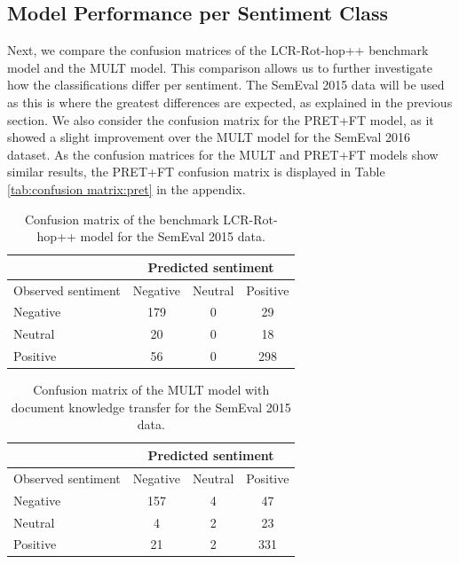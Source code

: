 \subsection{Model Performance per Sentiment Class}
Next, we compare the confusion matrices of the LCR-Rot-hop++ benchmark model and the MULT model. This comparison allows us to further investigate how the classifications differ per sentiment. The SemEval 2015 data will be used as this is where the greatest differences are expected, as explained in the previous section. We also consider the confusion matrix for the PRET+FT model, as it showed a slight improvement over the MULT model for the SemEval 2016 dataset. As the confusion matrices for the MULT and PRET+FT models show similar results, the PRET+FT confusion matrix is displayed in Table \ref{tab:confusion matrix:pret} in the appendix. 
\begin{table}[h]
\caption{Confusion matrix of the benchmark LCR-Rot-hop++ model for the SemEval 2015 data.}
\label{tab:confusion matrix LCR}
\setlength{\tabcolsep}{28.3pt}
\begin{tabular}{@{}lccc@{}}
\toprule
                   & \multicolumn{3}{c}{Predicted sentiment} \\ \midrule
Observed sentiment & Negative     & Neutral    & Positive    \\ \midrule
Negative           & 179          & 0          & 29          \\
Neutral            & 20           & 0          & 18          \\
Positive           & 56           & 0          & 298         \\ \bottomrule
\end{tabular}
\end{table}

\vspace{-3mm}

\begin{table}[h]
\caption{Confusion matrix of the MULT model with document knowledge transfer for the SemEval 2015 data.}
\label{tab:confusion matrix:mult}
\setlength{\tabcolsep}{28.3pt}
\begin{tabular}{@{}lccc@{}}
\toprule
                   & \multicolumn{3}{c}{Predicted sentiment} \\ \midrule
Observed sentiment & Negative     & Neutral    & Positive    \\ \midrule
Negative           & 157          & 4          & 47          \\
Neutral            & 4           & 2          & 23          \\
Positive           & 21           & 2          & 331         \\ \bottomrule
\end{tabular}
\end{table}

